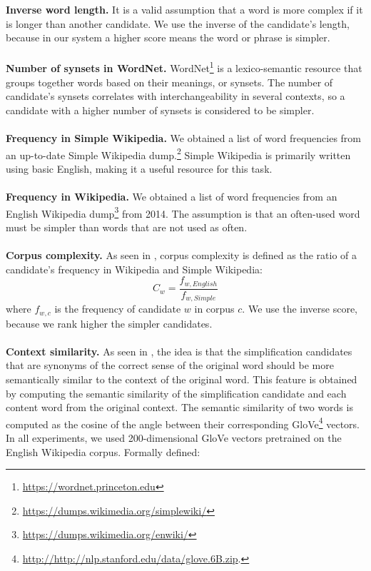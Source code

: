 \documentclass[10pt, a4paper]{article}
\begin{document}
\textbf{Inverse word length.} It is a valid assumption that a word is more complex if it is longer than another candidate. We use the inverse of the candidate's length, because in our system a higher score means the word or phrase is simpler. \paragraph{}
\textbf{Number of synsets in WordNet.} WordNet\footnote{\url{https://wordnet.princeton.edu}} is a lexico-semantic resource that groups together words based on their meanings, or synsets. The number of candidate's synsets correlates with interchangeability in several contexts, so a candidate with a higher number of synsets is considered to be simpler. \paragraph{}
\textbf{Frequency in Simple Wikipedia.} We obtained a list of word frequencies from an up-to-date Simple Wikipedia dump.\footnote{\url{https://dumps.wikimedia.org/simplewiki/}} Simple Wikipedia is primarily written using basic English, making it a useful resource for this task. \paragraph{}
\textbf{Frequency in Wikipedia.} We obtained a list of word frequencies from an English Wikipedia dump\footnote{\url{https://dumps.wikimedia.org/enwiki/}} from 2014. The assumption is that an often-used word must be simpler than words that are not used as often. \paragraph{}
\textbf{Corpus complexity.} As seen in \citep{biran2011putting}, corpus complexity is defined as the ratio of a candidate's frequency in Wikipedia and Simple Wikipedia:
\[ C_w = \frac{f_{w, English}}{f_{w, Simple}} \]
where $f_{w, c}$ is the frequency of candidate $w$ in corpus $c$. We use the inverse score, because we rank higher the simpler candidates. \paragraph{}
\textbf{Context similarity.} As seen in \citep{glavavs2015simplifying}, the idea is that the simplification candidates that are synonyms of the correct sense of the original word should be more semantically similar to the context of the original word. This feature is obtained by computing the semantic similarity of the simplification candidate and each content word from the original context. The semantic similarity of two words is computed as the cosine of the angle between their corresponding GloVe\footnote{\url{http://http://nlp.stanford.edu/data/glove.6B.zip}.} vectors. In all experiments, we used 200-dimensional GloVe vectors pretrained on the English Wikipedia corpus. Formally defined:
\end{document}

